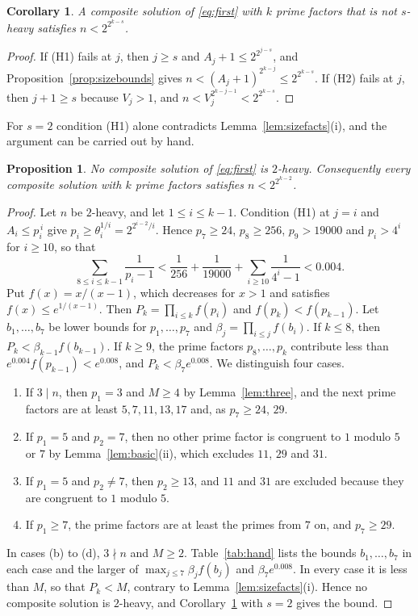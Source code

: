 \documentclass[11pt,reqno]{amsart}
\numberwithin{equation}{section}
\theoremstyle{plain}
\newtheorem{proposition}[theorem]{Proposition}
\newtheorem{corollary}[theorem]{Corollary}
\theoremstyle{definition}
\theoremstyle{remark}
\begin{document}
\begin{corollary}\label{cor:light}
A composite solution of \eqref{eq:first} with $k$ prime factors that
is not $s$-heavy satisfies $n<2^{2^{k-s}}$.
\end{corollary}

\begin{proof}
If (H1) fails at $j$, then $j\ge s$ and $A_j+1\le2^{2^{j-s}}$, and
Proposition~\ref{prop:sizebounds} gives
$n<(A_j+1)^{2^{k-j}}\le2^{2^{k-s}}$. If (H2) fails at $j$, then
$j+1\ge s$ because $V_j>1$, and $n<V_j^{2^{k-j-1}}<2^{2^{k-s}}$.
\end{proof}

For $s=2$ condition (H1) alone contradicts
Lemma~\ref{lem:sizefacts}(i), and the argument can be carried out by
hand.

\begin{proposition}\label{prop:hand}
No composite solution of \eqref{eq:first} is $2$-heavy. Consequently
every composite solution with $k$ prime factors satisfies
$n<2^{2^{k-2}}$.
\end{proposition}

\begin{proof}
Let $n$ be $2$-heavy, and let $1\le i\le k-1$. Condition (H1) at $j=i$
and $A_i\le p_i^{\,i}$ give $p_i\ge\theta_i^{1/i}=2^{2^{i-2}/i}$. Hence
$p_7\ge24$, $p_8\ge256$, $p_9>19000$ and $p_i>4^i$ for $i\ge10$, so
that
\[
  \sum_{8\le i\le k-1}\frac1{p_i-1}<\frac1{256}+\frac1{19000}
  +\sum_{i\ge10}\frac1{4^i-1}<0.004 .
\]
Put $f(x)=x/(x-1)$, which decreases for $x>1$ and satisfies
$f(x)\le e^{1/(x-1)}$. Then $P_k=\prod_{i\le k}f(p_i)$ and
$f(p_k)<f(p_{k-1})$. Let $b_1,\dots,b_7$ be lower bounds for
$p_1,\dots,p_7$ and $\beta_j=\prod_{i\le j}f(b_i)$. If $k\le8$, then
$P_k<\beta_{k-1}f(b_{k-1})$. If $k\ge9$, the prime factors
$p_8,\dots,p_k$ contribute less than $e^{0.004}f(p_{k-1})<e^{0.008}$,
and $P_k<\beta_7e^{0.008}$. We distinguish four cases.
\begin{enumerate}[label=(\alph*)]
\item If $3\mid n$, then $p_1=3$ and $M\ge4$ by Lemma~\ref{lem:three},
  and the next prime factors are at least $5,7,11,13,17$ and, as
  $p_7\ge24$, $29$.
\item If $p_1=5$ and $p_2=7$, then no other prime factor is congruent
  to $1$ modulo $5$ or $7$ by Lemma~\ref{lem:basic}(ii), which excludes
  $11$, $29$ and $31$.
\item If $p_1=5$ and $p_2\ne7$, then $p_2\ge13$, and $11$ and $31$ are
  excluded because they are congruent to $1$ modulo $5$.
\item If $p_1\ge7$, the prime factors are at least the primes from $7$
  on, and $p_7\ge29$.
\end{enumerate}
In cases (b) to (d), $3\nmid n$ and $M\ge2$. Table~\ref{tab:hand}
lists the bounds $b_1,\dots,b_7$ in each case and the larger of
$\max_{j\le7}\beta_jf(b_j)$ and $\beta_7e^{0.008}$. In every case it is
less than $M$, so that $P_k<M$, contrary to
Lemma~\ref{lem:sizefacts}(i). Hence no composite solution is
$2$-heavy, and Corollary~\ref{cor:light} with $s=2$ gives the bound.
\end{proof}
\end{document}
